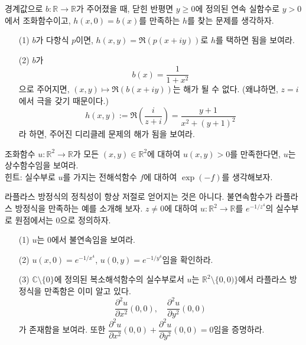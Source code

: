 \begin{salt_exercise}  \label{ex-5-8}
경계값으로  $b:\mathbb R \to \mathbb R$가 주어졌을 때,
닫힌 반평면 $y\ge0$에 정의된 연속 실함수로
$y>0$에서 조화함수이고, $h(x,0)=b(x)$를 만족하는 
$h$를 찾는 문제를 생각하자.
\begin{itemize}
\item[(1)] $b$가 다항식 $p$이면, $h(x,y) = \Re(p(x+iy))$로  $h$를 택하면 됨을 보여라.
\item[(2)] $b$가
\[
b(x) = \dfrac1{1+x^2}
\]
으로 주어지면, $(x,y) \mapsto \Re(b(x+iy))$는 해가 될 수 없다.
(왜냐하면, $z=i$에서 극을 갖기 때문이다.)
\[
h(x,y):= \Re\left(\dfrac{i}{z+i}\right) 
= \dfrac{y+1}{x^2+(y+1)^2}
\]
라 하면, 주어진 디리클레 문제의 해가 됨을 보여라.
\end{itemize}
\end{salt_exercise}

\begin{salt_exercise}\label{ex-5-9}
조화함수 $u:\mathbb R^2\to \mathbb R$가 모든 $(x,y)\in\mathbb R^2$에 대하여
$u(x,y)>0$를 만족한다면, $u$는 상수함수임을 보여라. \\
힌트: 실수부로 $u$를 가지는 전해석함수 $f$에 대하여  $\exp(-f)$를 생각해보자.
\end{salt_exercise}

\begin{salt_exercise}\label{ex-5-10}
라플라스 방정식의 정칙성이 항상 저절로 얻어지는 것은 아니다.
불연속함수가 라플라스 방정식을 만족하는 예를 소개해 보자.
$z\ne 0$에 대하여
$u:\mathbb R^2\to \mathbb R$를 $e^{-1/z^4}$의 실수부로 
원점에서는 $0$으로 정의하자.
\begin{itemize}
\item[(1)] $u$는 $0$에서 불연속임을 보여라.
\item[(2)] $u(x,0) = e^{-1/x^4}$, $u(0,y) = e^{-1/y^4}$임을 확인하라.
\item[(3)] $\mathbb C\setminus\{0\}$에 정의된 복소해석함수의 실수부로서
$u$는 $\mathbb R^2\setminus\{0,0)\}$에서 라플라스 방정식을 만족함은 이미 알고 있다.
\[
\dfrac{\partial^2 u}{\partial x^2}(0,0), \quad
\dfrac{\partial^2 u}{\partial y^2}(0,0)
\]
가 존재함을 보여라.
또한 $\dfrac{\partial^2 u}{\partial x^2}(0,0) + \dfrac{\partial^2 u}{\partial y^2}(0,0) =0$임을
증명하라.
\end{itemize}
\end{salt_exercise}

